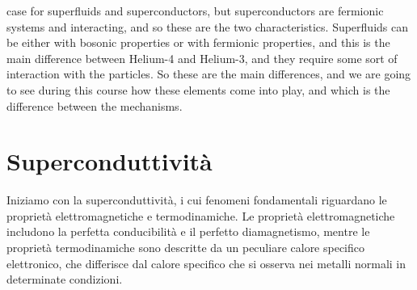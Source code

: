 case for superfluids and superconductors, but superconductors are fermionic systems and interacting, and so these are the two characteristics. Superfluids can be either with bosonic properties or with fermionic properties, and this is the main difference between Helium-4 and Helium-3, and they require some sort of interaction with the particles. So these are the main differences, and we are going to see during this course how these elements come into play, and which is the difference between the mechanisms.
\section{Superconduttività}
Iniziamo con la superconduttività, i cui fenomeni fondamentali riguardano le proprietà elettromagnetiche e termodinamiche. Le proprietà elettromagnetiche includono la perfetta conducibilità e il perfetto diamagnetismo, mentre le proprietà termodinamiche sono descritte da un peculiare calore specifico elettronico, che differisce dal calore specifico che si osserva nei metalli normali in determinate condizioni.
